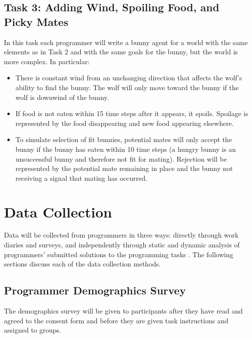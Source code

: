 \subsection{Task 3: Adding Wind, Spoiling Food, and Picky Mates}\label{sec:task3}

In this task each programmer will write a bunny agent for a world with the same elements as in Task 2 and with the same goals for the bunny, but the world is more complex.  In particular:

\begin{itemize}

\item There is constant wind from an unchanging direction that affects the wolf's ability to find the bunny.  The wolf will only move toward the bunny if the wolf is downwind of the bunny.

\item If food is not eaten within 15 time steps after it appears, it spoils.  Spoilage is represented by the food disappearing and new food appearing elsewhere.

\item To simulate selection of fit bunnies, potential mates will only accept the bunny if the bunny has eaten within 10 time steps (a hungry bunny is an unsuccessful bunny and therefore not fit for mating).  Rejection will be represented by the potential mate remaining in place and the bunny not receiving a signal that mating has occurred.

\end{itemize}



\section{Data Collection}

Data will be collected from programmers in three ways: directly through work diaries and surveys, and independently through static and dynamic analysis of programmers' submitted solutions to the programming tasks \cite{singer2008a-software}.  The following sections discuss each of the data collection methods.

\subsection{Programmer Demographics Survey}

The demographics survey will be given to participants after they have read and agreed to the consent form and before they are given task instructions and assigned to groups.

